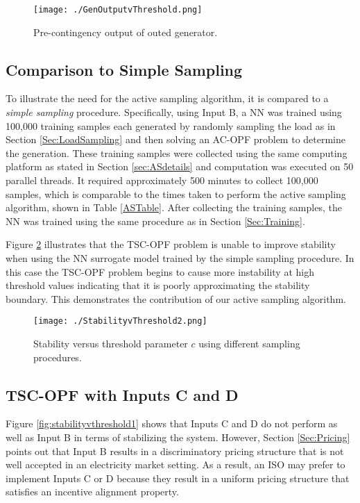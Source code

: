\documentclass[lettersize,journal]{IEEEtran}
\begin{document}
\begin{figure}[h!]
    \centering
    \texttt{[image: ./GenOutputvThreshold.png]}
    \caption{Pre-contingency output of outed generator.}
    \label{GenvThreshold}
\end{figure}


\subsection{Comparison to Simple Sampling}
To illustrate the need for the active sampling algorithm, it is compared to a \emph{simple sampling} procedure.  Specifically, using Input B, a NN was trained using 100,000 training samples each generated by randomly sampling the load as in Section \ref{Sec:LoadSampling} and then solving an AC-OPF problem to determine the generation.  These training samples were collected using the same computing platform as stated in Section \ref{sec:ASdetails} and computation was executed on 50 parallel threads.  It required approximately 500 minutes to collect 100,000 samples, which is comparable to the times taken to perform the active sampling algorithm, shown in Table \ref{ASTable}.  After collecting the training samples, the NN was trained using the same procedure as in Section \ref{Sec:Training}.

Figure \ref{fig:StabilityvThreshold2} illustrates that the TSC-OPF problem is unable to improve stability when using the NN surrogate model trained by the simple sampling procedure.  In this case the TSC-OPF problem begins to cause more instability at high threshold values indicating that it is poorly approximating the stability boundary.  This demonstrates the contribution of our active sampling algorithm. 


\begin{figure}[h!]
    \centering
    \texttt{[image: ./StabilityvThreshold2.png]}
    \caption{Stability versus threshold parameter $c$ using different sampling procedures.}
    \label{fig:StabilityvThreshold2}
\end{figure}


\subsection{TSC-OPF with Inputs C and D}
Figure \ref{fig:stabilityvthreshold1} shows that Inputs C and D do not perform as well as Input B in terms of stabilizing the system.  However, Section \ref{Sec:Pricing} points out that Input B results in a discriminatory pricing structure that is not well accepted in an electricity market setting.  As a result, an ISO may prefer to implement Inputs C or D because they result in a uniform pricing structure that satisfies an incentive alignment property.  
\end{document}
